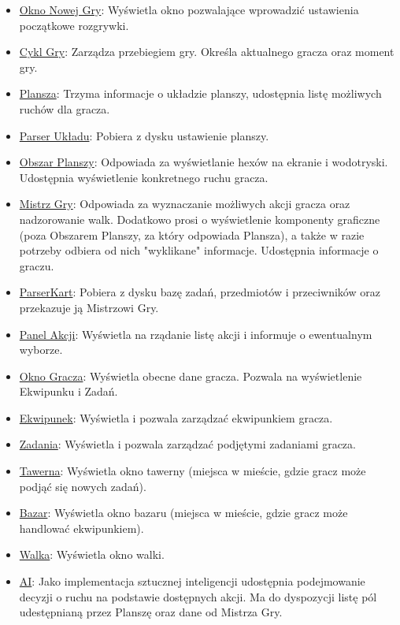 \documentclass[a4paper, 11pt]{article}
\begin{document}
\begin{itemize}
	\item \underline{Okno Nowej Gry}: Wyświetla okno pozwalające wprowadzić ustawienia początkowe rozgrywki.
	
	\item \underline{Cykl Gry}: Zarządza przebiegiem gry. Określa aktualnego gracza oraz moment gry.
	
	\item \underline{Plansza}: Trzyma informacje o układzie planszy, udostępnia listę możliwych ruchów dla gracza.
	
	\item \underline{Parser Układu}: Pobiera z dysku ustawienie planszy.
	
	\item \underline{Obszar Planszy}: Odpowiada za wyświetlanie hexów na ekranie i wodotryski. Udostępnia wyświetlenie konkretnego ruchu gracza.
	
	\item \underline{Mistrz Gry}: Odpowiada za wyznaczanie możliwych akcji gracza oraz nadzorowanie walk. Dodatkowo prosi o wyświetlenie komponenty graficzne (poza Obszarem Planszy, za który odpowiada Plansza), a także w razie potrzeby odbiera od nich "wyklikane" informacje. Udostępnia informacje o graczu.
	
	\item \underline{ParserKart}: Pobiera z dysku bazę zadań, przedmiotów i przeciwników oraz przekazuje ją Mistrzowi Gry.
	
	\item \underline{Panel Akcji}: Wyświetla na rządanie listę akcji i informuje o ewentualnym wyborze.
	
	\item \underline{Okno Gracza}: Wyświetla obecne dane gracza. Pozwala na wyświetlenie Ekwipunku i Zadań.
	
	\item \underline{Ekwipunek}: Wyświetla i pozwala zarządzać ekwipunkiem gracza.
	
	\item \underline{Zadania}: Wyświetla i pozwala zarządzać podjętymi zadaniami gracza. 
	
	\item \underline{Tawerna}: Wyświetla okno tawerny (miejsca w mieście, gdzie gracz może podjąć się nowych zadań).

	\item \underline{Bazar}: Wyświetla okno bazaru (miejsca w mieście, gdzie gracz może handlować ekwipunkiem).

	\item \underline{Walka}: Wyświetla okno walki.

	\item \underline{AI}: Jako implementacja sztucznej inteligencji udostępnia podejmowanie decyzji o ruchu na podstawie dostępnych akcji. Ma do dyspozycji listę pól udestępnianą przez Planszę oraz dane od Mistrza Gry.
\end{itemize}
\end{document}

